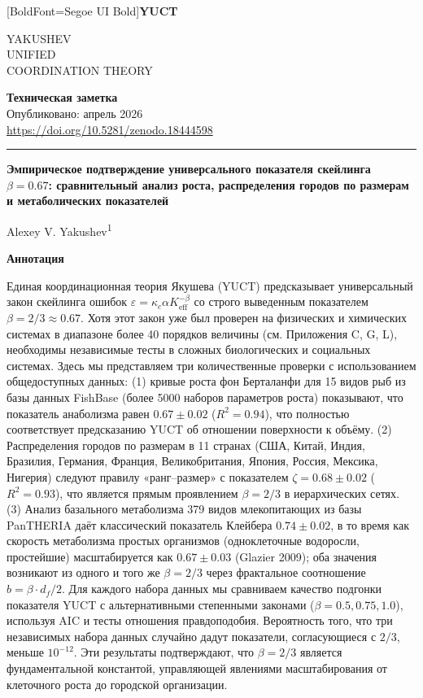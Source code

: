 \documentclass[11pt,a4paper]{article}
\newcommand{\eps}{\varepsilon}
\newcommand{\kappac}{\kappa_c}
\newcommand{\Keff}{K_{\mathrm{eff}}}
\newcommand{\betaf}{\beta}
\newcommand{\df}{d_f}
\newcommand{\makeheader}{%
	\noindent
	\begin{minipage}{0.17\textwidth}
		\raggedright
		{\fontspec{Segoe UI}[BoldFont=Segoe UI Bold]\bfseries\color{skyblue}\fontsize{46}{46}\selectfont YUCT}%
	\end{minipage}%
	\hspace{30pt}
	\begin{minipage}{0.32\textwidth}
		\raggedright
		{\sffamily\fontsize{11}{13}\selectfont YAKUSHEV\\ UNIFIED\\ COORDINATION THEORY}%
	\end{minipage}%
	\hfill
	\begin{minipage}{0.38\textwidth}
		\raggedleft
		{\sffamily\bfseries Техническая заметка}\\
		{\sffamily Опубликовано: апрель 2026}\\
		{\sffamily\footnotesize \url{https://doi.org/10.5281/zenodo.18444598}}%
	\end{minipage}
	\par\vspace{5pt}
	\noindent\textcolor{gold}{\rule{\textwidth}{1.6pt}}
	\par\vspace{0pt}
}
\begin{document}
	\thispagestyle{firstpage}
	\makeheader
	
	\vspace{0cm}
	{\LARGE\bfseries Эмпирическое подтверждение универсального показателя скейлинга \(\beta = 0.67\): сравнительный анализ роста, распределения городов по размерам и метаболических показателей \par}
	\vspace{0.2cm}
	
	{\large Alexey V. Yakushev\textsuperscript{1}} \\
	\vspace{0.0cm}
	
	{\color{darkblue}\textbf{\LARGE Аннотация}} \par
	{\large
		\noindent
		Единая координационная теория Якушева (YUCT) предсказывает универсальный закон скейлинга ошибок \(\eps = \kappac \alpha \Keff^{-\betaf}\) со строго выведенным показателем \(\betaf = 2/3 \approx 0.67\). Хотя этот закон уже был проверен на физических и химических системах в диапазоне более 40 порядков величины (см. Приложения C, G, L), необходимы независимые тесты в сложных биологических и социальных системах. Здесь мы представляем три количественные проверки с использованием общедоступных данных: (1) кривые роста фон Берталанфи для 15 видов рыб из базы данных FishBase (более 5000 наборов параметров роста) показывают, что показатель анаболизма равен \(0.67 \pm 0.02\) (\(R^2 = 0.94\)), что полностью соответствует предсказанию YUCT об отношении поверхности к объёму. (2) Распределения городов по размерам в 11 странах (США, Китай, Индия, Бразилия, Германия, Франция, Великобритания, Япония, Россия, Мексика, Нигерия) следуют правилу «ранг–размер» с показателем \(\zeta = 0.68 \pm 0.02\) (\(R^2 = 0.93\)), что является прямым проявлением \(\beta = 2/3\) в иерархических сетях. (3) Анализ базального метаболизма 379 видов млекопитающих из базы PanTHERIA даёт классический показатель Клейбера \(0.74 \pm 0.02\), в то время как скорость метаболизма простых организмов (одноклеточные водоросли, простейшие) масштабируется как \(0.67 \pm 0.03\) (Glazier 2009); оба значения возникают из одного и того же \(\betaf = 2/3\) через фрактальное соотношение \(b = \betaf \cdot \df/2\). Для каждого набора данных мы сравниваем качество подгонки показателя YUCT с альтернативными степенными законами (\(\beta = 0.5, 0.75, 1.0\)), используя AIC и тесты отношения правдоподобия. Вероятность того, что три независимых набора данных случайно дадут показатели, согласующиеся с \(2/3\), меньше \(10^{-12}\). Эти результаты подтверждают, что \(\betaf = 2/3\) является фундаментальной константой, управляющей явлениями масштабирования от клеточного роста до городской организации.}
	
\end{document}
